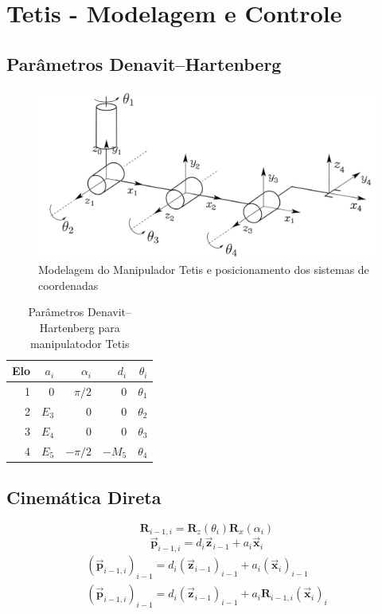 \chapter{Tetis - Modelagem e Controle}

\section{Parâmetros Denavit–Hartenberg}

\begin{figure}[!ht]
\centering
  \includegraphics[width=0.9\linewidth]{./img/m2_meio_2.png}
  \caption{Modelagem do Manipulador Tetis e posicionamento dos sistemas de coordenadas}
  \label{fig:modelo_tetis}
\end{figure}%

\begin{table}[!ht]
\centering
\caption{Parâmetros Denavit–Hartenberg para manipulatodor Tetis}
\label{tab:dh_tetis}
\begin{tabular}{rrrrr} \hline
Elo & $a_i$ & $\alpha_i$ & $d_i$  & $\theta_i$ \\ \hline
1   & 0     & $\pi/2$    & 0      & $\theta_1$ \\
2   & $E_3$ & 0          & 0      & $\theta_2$ \\
3   & $E_4$ & 0          & 0      & $\theta_3$ \\
4   & $E_5$ & $-\pi/2$   & $-M_5$ & $\theta_4$ \\ \hline
\end{tabular}
\end{table}

\section{Cinemática Direta}

\begin{equation}
\bm{R}_{i-1,i} = \bm{R}_z(\theta_i)\bm{R}_x(\alpha_i)
\end{equation}
\begin{equation}
\bm{\vec{p}}_{i-1,i} = d_i \bm{\vec{z}}_{i-1} + a_i \bm{\vec{x}}_i
\end{equation}
\begin{gather}
(\bm{\vec{p}}_{i-1,i})_{i-1} = d_i (\bm{\vec{z}}_{i-1})_{i-1} + a_i (\bm{\vec{x}}_i)_{i-1} \\
(\bm{\vec{p}}_{i-1,i})_{i-1} = d_i (\bm{\vec{z}}_{i-1})_{i-1} + a_i \bm{R}_{i-1,i}(\bm{\vec{x}}_i)_{i} 
\end{gather}

